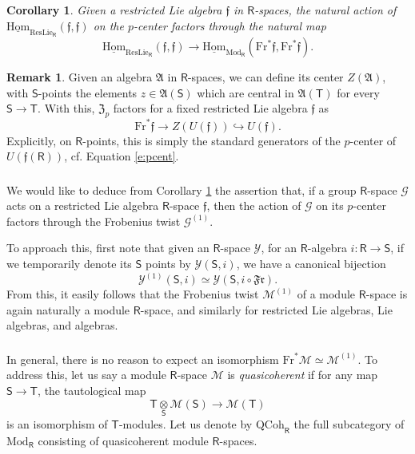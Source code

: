 \documentclass{amsart}
\newtheorem{Cor}[Thm]{Corollary}
\theoremstyle{definition}
\newtheorem{Rem}[Thm]{Remark}
\newcommand{\uHom}{\underline{\on{Hom}}}
\newcommand{\sY}{\mathscr{Y}}
\newcommand{\sss}{\subsubsection{}}
\newcommand{\fr}{^\on{(1)}}
\newcommand{\Sing}{\mathsf{S}}
\newcommand{\Ting}{\mathsf{T}}
\newcommand{\sM}{\mathscr{M}}
\newcommand{\on}{\mathrm}
\newcommand{\Ring}{\mathsf{R}}
\newcommand{\ff}{\mathfrak{f}}
\newcommand{\fZ}{\mathfrak{Z}}
\numberwithin{equation}{section}
\begin{document}

\begin{Cor} \label{c:funct}Given a restricted Lie algebra $\ff$ in $\Ring$-spaces, the natural action of $\uHom_{\on{ResLie}_\Ring}(\ff, \ff)$ on the $p$-center factors through the natural map 
$$\uHom_{\on{ResLie}_\Ring}(\ff, \ff) \rightarrow \uHom_{\on{Mod}_\Ring}(\on{Fr}^* \ff, \on{Fr}^* \ff).$$
\end{Cor}


\begin{Rem}\label{r:pcencen}Given an algebra $\mathfrak{A}$ in $\Ring$-spaces, we can define its center $Z(\mathfrak{A})$, with $\Sing$-points the elements $z \in \mathfrak{A}(\Sing)$ which are central in $\mathfrak{A}(\Ting)$ for every $\Sing \rightarrow \Ting$. With this, $\fZ_p$ factors for a fixed restricted Lie algebra $\ff$ as $$\on{Fr}^* \ff \rightarrow Z(U(\ff)) \hookrightarrow U(\ff).$$Explicitly, on $\Ring$-points, this is simply the standard generators of the $p$-center of $U(\ff(\Ring))$, cf. Equation \eqref{e:pcent}.
\end{Rem}


\sss We would like to deduce from Corollary \ref{c:funct} the assertion that, if a group $\Ring$-space $\mathscr{G}$ acts on a restricted Lie algebra $\Ring$-space $\ff$, then the action of $\mathscr{G}$ on its $p$-center factors through the Frobenius twist $\mathscr{G}\fr$. 

To approach this, first note that given an $\Ring$-space $\sY$, for an $\Ring$-algebra $i: \Ring \rightarrow \Sing$, if we temporarily denote its $\Sing$ points by $\sY(\Sing, i)$, we have a canonical bijection 
$$\sY\fr(\Sing, i) \simeq \sY(\Sing, i \circ \mathfrak{Fr}).$$
From this, it easily follows that the Frobenius twist $\sM\fr$ of a module $\Ring$-space is again naturally a module $\Ring$-space, and similarly for restricted Lie algebras, Lie algebras, and algebras. 

\sss In general, there is no reason to expect an isomorphism $\on{Fr}^* \sM \simeq \sM\fr$. To address this, let us say a module $\Ring$-space $\sM$ is {\em quasicoherent} if for any map $\Sing \rightarrow \Ting$, the tautological map $$\Ting \underset{\Sing}{\otimes} \sM(\Sing) \rightarrow \sM(\Ting)$$is an isomorphism of $\Ting$-modules. Let us denote by $\on{QCoh}_\Ring$ the full subcategory of $\on{Mod}_\Ring$ consisting of quasicoherent module $\Ring$-spaces. 
\end{document}
